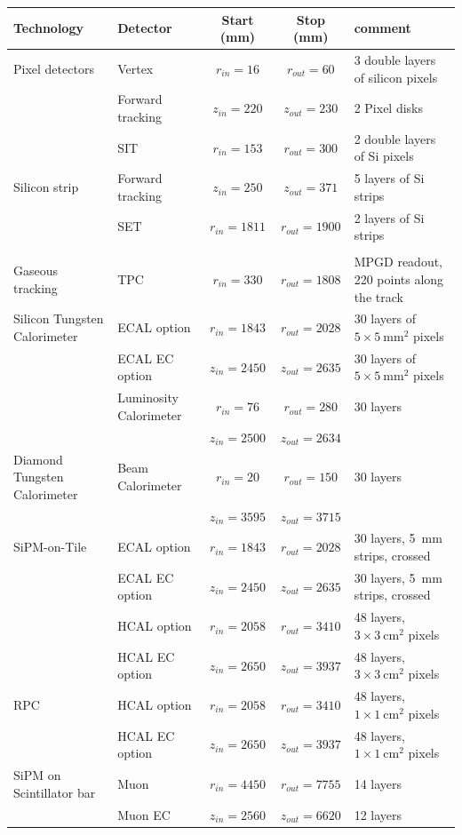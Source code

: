 \documentclass[%
 amsmath,amssymb,
 aps,
 longbibliography,
]{revtex4-1}
\renewcommand{\toprule}{\hline}
\newcommand{\midrule}{\hline}
\begin{document}
\begin{table}[th]
    \centering
    \begin{tabular}{|l|l|c|c|p{4cm}|}
    \toprule
        {\bf Technology} & {\bf Detector} & {\bf Start (mm)}   & {\bf Stop (mm)} & {\bf comment} \\
        \midrule
Pixel detectors & Vertex & $r_{in}=16$   & $r_{out}=60$   & 3 double layers of silicon pixels \\
& Forward tracking  & $z_{in}=220$ & $z_{out}=230$ & 2 Pixel disks \\
 & SIT    & $r_{in}=153$  & $r_{out}=300$  & 2 double layers of Si pixels            \\
\midrule
Silicon strip & Forward tracking  & $z_{in}=250$ & $z_{out}=371$ & 5 layers of Si strips\\
                & SET    & $r_{in}=1811$ & $r_{out}=1900$ & 2 layers of Si strips           \\
                & & & & \\
\midrule
Gaseous tracking & TPC & $r_{in}=330$ & $r_{out}=1808$ & MPGD readout, 220 points along the track\\
\midrule
Silicon Tungsten Calorimeter & ECAL option& $r_{in}=1843$ & $r_{out}=2028$ & 30 layers of $5\times 5~\mathrm{mm}^2$ pixels \\
& ECAL EC option & $z_{in}=2450$ & $z_{out}=2635$ & 30 layers of $5\times 5~\mathrm{mm}^2$ pixels \\
& Luminosity Calorimeter &$r_{in}=76$ & $r_{out}=280$& 30 layers\\
& &$z_{in}=2500$ & $z_{out}=2634$& \\
\midrule
Diamond Tungsten Calorimeter & Beam Calorimeter &$r_{in}=20$ &$r_{out}=150$& 30 layers\\
&& $z_{in}=3595$&$z_{out}=3715$&\\
\midrule
SiPM-on-Tile & ECAL option   & $r_{in}=1843$ & $r_{out}=2028$ & 30 layers, 5~mm strips, crossed\\
& ECAL EC option& $z_{in}=2450$ & $z_{out}=2635$ & 30 layers, 5~mm strips, crossed\\
             & HCAL option   & $r_{in}=2058$ & $r_{out}=3410$ & 48 layers, $3\times 3~\mathrm{cm}^2$ pixels\\
             & HCAL EC option& $z_{in}=2650$ & $z_{out}=3937$ & 48 layers, $3\times 3~\mathrm{cm}^2$ pixels\\
\midrule
RPC          & HCAL option   & $r_{in}=2058$ & $r_{out}=3410$ & 48 layers, $1 \times 1 ~\mathrm{cm}^2$ pixels \\
& HCAL EC option & $z_{in}=2650$ & $z_{out}=3937$ & 48 layers, $1 \times 1~\mathrm{cm}^2$ pixels\\
\midrule
SiPM on Scintillator bar & Muon & $r_{in}=4450$ & $r_{out}=7755$ & 14 layers \\
& Muon EC & $z_{in}=2560$ & $z_{out}=6620$ & 12 layers \\


\end{tabular}
\end{table}
\end{document}
